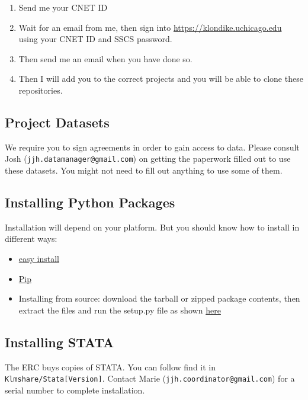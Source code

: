\documentclass{article}
\begin{document}
	\begin{enumerate}
		\item Send me your CNET ID
		\item Wait for an email from me, then sign into 
		\url{https://klondike.uchicago.edu} using your CNET ID and SSCS
		password.
		\item Then send me an email when you have done so.
		\item Then I will add you to the correct projects and you will
		be able to clone these repositories.
	\end{enumerate}

	\subsection*{Project Datasets} \label{sec:dataacess}
	We require you to sign agreements in order to gain access to data.
	Please consult Josh (\texttt{jjh.datamanager@gmail.com}) on 
	getting the paperwork filled out to use these datasets. You might
	not need to fill out anything to use some of them.

	\subsection*{Installing Python Packages} \label{sec:pypackage}
	Installation will depend on your platform. But you should know how
	to install in different ways:

	\begin{itemize}
		\item \href{http://pythonhosted.org//setuptools/easy_install.html#downloading-and-installing-a-package}{easy install}
		\item \href{http://www.pip-installer.org/en/latest/installing.html}{Pip}
		\item Installing from source: download the tarball or zipped package
		contents, then extract the files and run the setup.py file as shown
		\href{https://docs.python.org/2/install/index.html#platform-variations}{here}
	\end{itemize}

	\subsection*{Installing STATA} \label{sec:stata}
	The ERC buys copies of STATA. You can follow find it in 
	\texttt{Klmshare/Stata[Version]}. Contact Marie (\texttt{jjh.coordinator@gmail.com}) for a serial number to complete installation.
\end{document}

